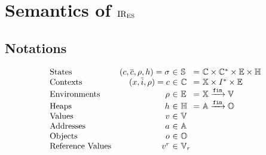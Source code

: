 \section{Semantics of \( \text{IR}_\text{ES} \)}\label{sec:semantics}

\subsection{Notations}

\[
  \begin{array}{lr@{~}c@{~}l@{~}c@{~}l}
    \text{States} & (\ctxt, \ctxtstack, \env, \heap) = \st &\in& \stset &=&
    \ctxtset \times \ctxtset^* \times \envset \times \heapset\\
    \text{Contexts} & (\id, \insts, \env) = \ctxt &\in& \ctxtset &=&
    \idset \times \instset^* \times \envset\\
    \text{Environments} & \env &\in& \envset &=&
    \idset \finmap \valset\\
    \text{Heaps} & \heap &\in& \heapset &=&
    \addrset \finmap \objset\\
    \text{Values} & \val &\in& \valset\\
    \text{Addresses} & \addr &\in& \addrset\\
    \text{Objects} & \obj &\in& \objset\\
    \text{Reference Values} & \refval &\in& \refvalset\\
  \end{array}
\]

